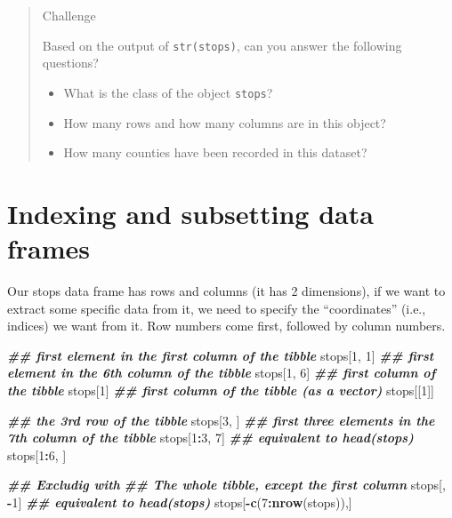 \documentclass[
]{book}
\newenvironment{Shaded}{\begin{snugshade}}{\end{snugshade}}
\newcommand{\DecValTok}[1]{\textcolor[rgb]{0.00,0.00,0.81}{#1}}
\newcommand{\DocumentationTok}[1]{\textcolor[rgb]{0.56,0.35,0.01}{\textbf{\textit{#1}}}}
\newcommand{\FunctionTok}[1]{\textcolor[rgb]{0.13,0.29,0.53}{\textbf{#1}}}
\newcommand{\NormalTok}[1]{#1}
\newcommand{\SpecialCharTok}[1]{\textcolor[rgb]{0.81,0.36,0.00}{\textbf{#1}}}
\providecommand{\tightlist}{%
  \setlength{\itemsep}{0pt}\setlength{\parskip}{0pt}}
\begin{document}
\begin{quote}
Challenge

Based on the output of \texttt{str(stops)}, can you answer the following questions?

\begin{itemize}
\tightlist
\item
  What is the class of the object \texttt{stops}?
\item
  How many rows and how many columns are in this object?
\item
  How many counties have been recorded in this dataset?
\end{itemize}
\end{quote}

\hypertarget{indexing-and-subsetting-data-frames}{%
\section{Indexing and subsetting data frames}\label{indexing-and-subsetting-data-frames}}

Our stops data frame has rows and columns (it has 2 dimensions), if we want to
extract some specific data from it, we need to specify the ``coordinates'' (i.e., indices) we want from it. Row numbers come first, followed by column numbers.

\begin{Shaded}
\begin{Highlighting}[]
\DocumentationTok{\#\# first element in the first column of the tibble}
\NormalTok{stops[}\DecValTok{1}\NormalTok{, }\DecValTok{1}\NormalTok{]}
\DocumentationTok{\#\# first element in the 6th column of the tibble }
\NormalTok{stops[}\DecValTok{1}\NormalTok{, }\DecValTok{6}\NormalTok{]}
\DocumentationTok{\#\# first column of the tibble}
\NormalTok{stops[}\DecValTok{1}\NormalTok{]}
\DocumentationTok{\#\# first column of the tibble (as a vector)}
\NormalTok{stops[[}\DecValTok{1}\NormalTok{]]}

\DocumentationTok{\#\# the 3rd row of the tibble}
\NormalTok{stops[}\DecValTok{3}\NormalTok{, ]}
\DocumentationTok{\#\# first three elements in the 7th column of the tibble}
\NormalTok{stops[}\DecValTok{1}\SpecialCharTok{:}\DecValTok{3}\NormalTok{, }\DecValTok{7}\NormalTok{]}
\DocumentationTok{\#\# equivalent to head(stops) }
\NormalTok{stops[}\DecValTok{1}\SpecialCharTok{:}\DecValTok{6}\NormalTok{, ]}

\DocumentationTok{\#\# Excludig with \textquotesingle{}{-}\textquotesingle{}}
\DocumentationTok{\#\# The whole tibble, except the first column}
\NormalTok{stops[, }\SpecialCharTok{{-}}\DecValTok{1}\NormalTok{]          }
\DocumentationTok{\#\# equivalent to head(stops)  }
\NormalTok{stops[}\SpecialCharTok{{-}}\FunctionTok{c}\NormalTok{(}\DecValTok{7}\SpecialCharTok{:}\FunctionTok{nrow}\NormalTok{(stops)),]}
\end{Highlighting}
\end{Shaded}
\end{document}
